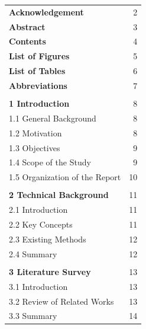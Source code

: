 \documentclass[12pt]{article}
\begin{document}
\noindent
\begin{tabular}{p{13cm} r}

\textbf{Acknowledgement} & 2 \\
\textbf{Abstract} & 3 \\
\textbf{Contents} & 4 \\
\textbf{List of Figures} & 5 \\
\textbf{List of Tables} & 6 \\
\textbf{Abbreviations} & 7 \\

\\

\textbf{1 \hspace{0.3cm} Introduction} & 8 \\
\hspace{0.5cm}1.1 General Background & 8 \\
\hspace{0.5cm}1.2 Motivation & 8 \\
\hspace{0.5cm}1.3 Objectives & 9 \\
\hspace{0.5cm}1.4 Scope of the Study & 9 \\
\hspace{0.5cm}1.5 Organization of the Report & 10 \\

\\

\textbf{2 \hspace{0.3cm} Technical Background} & 11 \\
\hspace{0.5cm}2.1 Introduction & 11 \\
\hspace{0.5cm}2.2 Key Concepts & 11 \\
\hspace{0.5cm}2.3 Existing Methods & 12 \\
\hspace{0.5cm}2.4 Summary & 12 \\

\\

\textbf{3 \hspace{0.3cm} Literature Survey} & 13 \\
\hspace{0.5cm}3.1 Introduction & 13 \\
\hspace{0.5cm}3.2 Review of Related Works & 13 \\
\hspace{0.5cm}3.3 Summary & 14 \\


\end{tabular}
\end{document}
